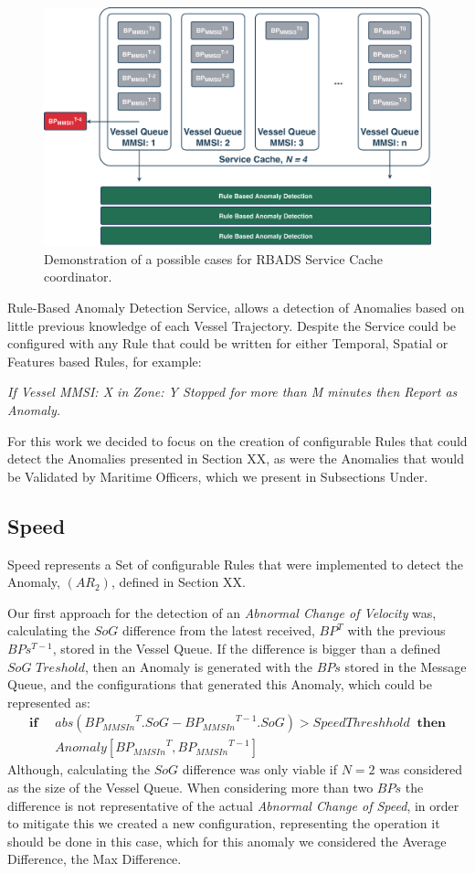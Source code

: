 \begin{figure}[H]
	\centering
	\includegraphics[scale = .36]{figures/Ch4/RBADS.pdf}
    \caption{Demonstration of a possible cases for RBADS Service Cache coordinator.}
    \label{fig: RBADS}
\end{figure}

Rule-Based Anomaly Detection Service, allows a detection of Anomalies based on little previous knowledge of each Vessel Trajectory. Despite the Service could be configured with any Rule that could be written for either Temporal, Spatial or Features based Rules, for example:

\textit{If Vessel MMSI: X in Zone: Y Stopped for more than M minutes then Report as Anomaly.}

For this work we decided to focus on the creation of configurable Rules that could detect the Anomalies presented in Section XX, as were the Anomalies that would be Validated by Maritime Officers,  which we present in Subsections Under.

\subsection{Speed}
Speed represents a Set of configurable Rules that were implemented to detect the Anomaly, $(AR_2)$, defined in Section XX.

Our first approach for the detection of an \textit{Abnormal Change of Velocity} was, calculating the $SoG$ difference from the latest received, $BP^T$ with the previous $BPs^{T-1}$, stored in the Vessel Queue.
If the difference is bigger than a defined $SoG$ $Treshold$, then an Anomaly is generated with the $BPs$ stored in the Message Queue, and the configurations that generated this Anomaly, which could be represented as:
\begin{align*}
\mathbf{if}\;\;& abs({BP_{MMSIn}}^{T}.SoG - {BP_{MMSIn}}^{T-1}.SoG) > SpeedThreshhold
\;\;\mathbf{then} \\ 
&Anomaly[{BP_{MMSIn}}^{T}, {BP_{MMSIn}}^{T-1}] 
\end{align*}
Although, calculating the $SoG$ difference was only viable if  $N = 2 $ was considered as the size of the Vessel Queue.
When considering more than two $BPs$ the difference is not representative of the actual \textit{Abnormal Change of Speed}, in order to mitigate this we created a new configuration, representing the operation it should be done in this case, which for this anomaly we considered the Average Difference, the Max Difference.

